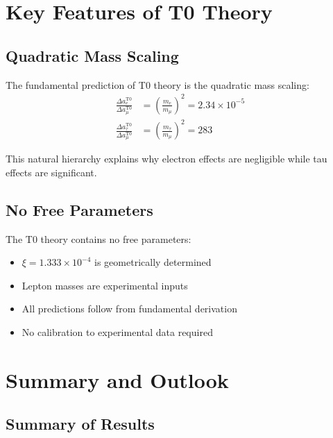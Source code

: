 \documentclass[12pt,a4paper]{article}
\begin{document}
	\section{Key Features of T0 Theory}
	
	\subsection{Quadratic Mass Scaling}
	
	\begin{keyresult}
		The fundamental prediction of T0 theory is the quadratic mass scaling:
		\begin{align}
			\frac{\Delta a_e^{\mathrm{T0}}}{\Delta a_\mu^{\mathrm{T0}}} &= \left(\frac{m_e}{m_\mu}\right)^2 = 2.34 \times 10^{-5} \\
			\frac{\Delta a_\tau^{\mathrm{T0}}}{\Delta a_\mu^{\mathrm{T0}}} &= \left(\frac{m_\tau}{m_\mu}\right)^2 = 283
		\end{align}
		
		This natural hierarchy explains why electron effects are negligible while tau effects are significant.
	\end{keyresult}
	
	\subsection{No Free Parameters}
	
	\begin{keyresult}
		The T0 theory contains no free parameters:
		\begin{itemize}
			\item $\xi = 1.333 \times 10^{-4}$ is geometrically determined
			\item Lepton masses are experimental inputs
			\item All predictions follow from fundamental derivation
			\item No calibration to experimental data required
		\end{itemize}
	\end{keyresult}
	
	\section{Summary and Outlook}
	
	\subsection{Summary of Results}
	
\end{document}
